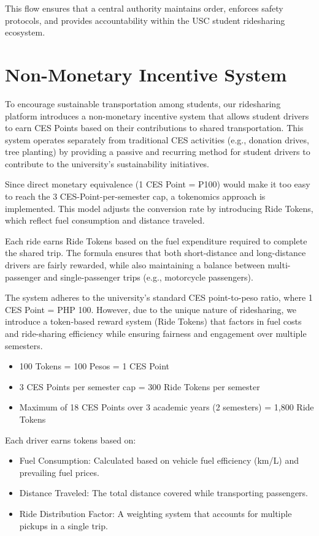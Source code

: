 This flow ensures that a central authority maintains order, enforces safety protocols, and provides accountability within the USC student ridesharing ecosystem.

\section{Non-Monetary Incentive System}
\label{sec:tokens}
To encourage sustainable transportation among students, our ridesharing platform introduces a non-monetary incentive system that allows student drivers to earn %
CES Points based on their contributions to shared transportation. This system operates separately from traditional CES activities (e.g., donation drives, tree planting) by providing a passive and recurring method for student drivers to contribute to the university’s sustainability initiatives.

Since direct monetary equivalence (1 CES Point = ₱100) would make it too easy to reach the 3 CES-Point-per-semester cap, a tokenomics approach is implemented. This model adjusts the conversion rate by introducing Ride Tokens, which reflect fuel consumption and distance traveled.

Each ride earns Ride Tokens based on the fuel expenditure required to complete the shared trip. The formula ensures that both short-distance and long-distance drivers are fairly rewarded, while also maintaining a balance between multi-passenger and single-passenger trips (e.g., motorcycle passengers).

The system adheres to the university’s standard CES point-to-peso ratio, where 1 CES Point = PHP 100. However, due to the unique nature of ridesharing, we introduce a token-based reward system (Ride Tokens) that factors in fuel costs and ride-sharing efficiency while ensuring fairness and engagement over multiple semesters.

\begin{itemize}
    \item 100 Tokens = 100 Pesos = 1 CES Point
    \item 3 CES Points per semester cap = 300 Ride Tokens per semester
    \item Maximum of 18 CES Points over 3 academic years (2 semesters) = 1,800 Ride Tokens
\end{itemize}

Each driver earns tokens based on:
\begin{itemize}
    \item Fuel Consumption: Calculated based on vehicle fuel efficiency (km/L) and prevailing fuel prices.
    \item Distance Traveled: The total distance covered while transporting passengers.
    \item Ride Distribution Factor: A weighting system that accounts for multiple pickups in a single trip.
\end{itemize}

